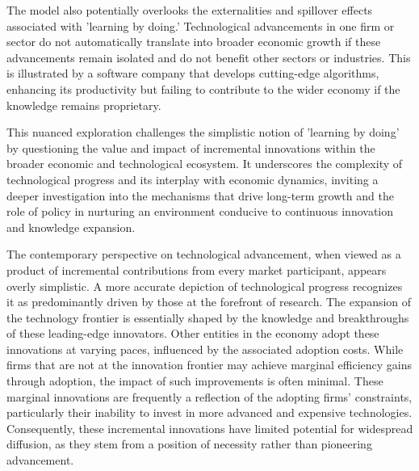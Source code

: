\documentclass[12pt]{report}
\begin{document}
The model also potentially overlooks the externalities and spillover effects associated with 'learning by doing.'
Technological advancements in one firm or sector do not automatically translate into broader economic growth if these
advancements remain isolated and do not benefit other sectors or industries. This is illustrated by a software company
that develops cutting-edge algorithms, enhancing its productivity but failing to contribute to the wider economy if the
knowledge remains proprietary.


This nuanced exploration challenges the simplistic notion of 'learning by doing' by questioning the value and impact of
incremental innovations within the broader economic and technological ecosystem. It underscores the complexity of
technological progress and its interplay with economic dynamics, inviting a deeper investigation into the mechanisms
that drive long-term growth and the role of policy in nurturing an environment conducive to continuous innovation and
knowledge expansion. 

The contemporary perspective on technological advancement, when viewed as a product of incremental contributions from
every market participant, appears overly simplistic. A more accurate depiction of technological progress recognizes it
as predominantly driven by those at the forefront of research. The expansion of the technology frontier is essentially
shaped by the knowledge and breakthroughs of these leading-edge innovators. Other entities in the economy adopt these
innovations at varying paces, influenced by the associated adoption costs. While firms that are not at the innovation
frontier may achieve marginal efficiency gains through adoption, the impact of such improvements is often minimal. These
marginal innovations are frequently a reflection of the adopting firms' constraints, particularly their inability to
invest in more advanced and expensive technologies. Consequently, these incremental innovations have limited potential
for widespread diffusion, as they stem from a position of necessity rather than pioneering advancement. 
\end{document}
